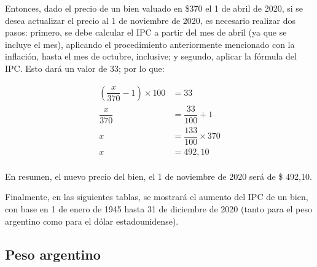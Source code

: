 \documentclass[12pt,a4paper,twoside]{book}
\begin{document}
Entonces, dado el precio de un bien valuado en \$370 el 1 de abril de 2020, si se desea actualizar el precio al 1 de noviembre de 2020, es necesario realizar dos pasos: primero, se debe calcular el IPC a partir del mes de abril (ya que se incluye el mes), aplicando el procedimiento anteriormente mencionado con la inflación, hasta el mes de octubre, inclusive; y segundo, aplicar la fórmula del IPC. Esto dará un valor de 33; por lo que:

\begin{align*}
\left( \dfrac{x}{370} - 1 \right) \times 100 &= 33 \\
\dfrac{x}{370} &= \dfrac{33}{100} +1 \\
x &= \dfrac{133}{100} \times 370 \\
x &= 492,10 \\
\end{align*}

En resumen, el nuevo precio del bien, el 1 de noviembre de 2020 será de \$ 492,10.

Finalmente, en las siguientes tablas, se mostrará el aumento del IPC de un bien, con base en 1 de enero de 1945 hasta 31 de diciembre de 2020 (tanto para el peso argentino como para el dólar estadounidense).
\newpage

\subsection{Peso argentino}

\newpage
\end{document}
